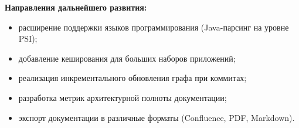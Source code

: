 \textbf{Направления дальнейшего развития:}
\begin{itemize}
  \item расширение поддержки языков программирования (Java-парсинг на уровне PSI);
  \item добавление кеширования для больших наборов приложений;
  \item реализация инкрементального обновления графа при коммитах;
  \item разработка метрик архитектурной полноты документации;
  \item экспорт документации в различные форматы (Confluence, PDF, Markdown).
\end{itemize}
